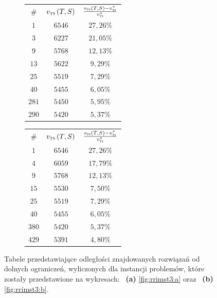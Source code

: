 \begin{figure}[!htbp]
	\null\hfill
	\begin{subfigure}[b]{0.3\textwidth}
		\centering
		\begin{tabular}{ccc}
			\hline
			\# & $v_{\textsc{ts}} \left( T, S \right)$ & $\frac{v_{\textsc{ts}} \left( T, S \right) - v_{\textsc{ts}}^{\ast}}{v_{\textsc{ts}}^{\ast}}$ \\
			$1$	&	$6546$	&	$27,26\%$	\\
			$3$	&	$6227$	&	$21,05\%$	\\
			$9$	&	$5768$	&	$12,13\%$	\\
			$13$	&	$5622$	&	$9,29\%$	\\
			$25$	&	$5519$	&	$7,29\%$	\\
			$40$	&	$5455$	&	$6,05\%$	\\
			$281$	&	$5450$	&	$5,95\%$	\\
			$290$	&	$5420$	&	$5,37\%$ \\\hline                                                                                                    
		\end{tabular}
		\caption{}
		\label{fig:rrimst3tab:a}
	\end{subfigure}
	\hfill
	\begin{subfigure}[b]{0.3\textwidth}
		\centering
		\begin{tabular}{ccc}
			\hline
			\# & $v_{\textsc{ts}} \left( T, S \right)$ & $\frac{v_{\textsc{ts}} \left( T, S \right) - v_{\textsc{ts}}^{\ast}}{v_{\textsc{ts}}^{\ast}}$ \\
			$1$	&	$6546$	&	$27,26\%$	\\
			$4$	&	$6059$	&	$17,79\%$	\\
			$9$	&	$5768$	&	$12,13\%$	\\
			$15$	&	$5530$	&	$7,50\%$	\\
			$25$	&	$5519$	&	$7,29\%$	\\
			$40$	&	$5455$	&	$6,05\%$	\\
			$380$	&	$5420$	&	$5,37\%$	\\
			$429$	&	$5391$	&	$4,80\%$	\\\hline                                                                                                  
		\end{tabular}
		\caption{}
		\label{fig:rrimst3tab:b}
	\end{subfigure}
	\hfill\null
	\caption{
		Tabele przedstawiające odległości znajdowanych rozwiązań od dolnych ograniczeń, wyliczonych dla instancji problemów, które zostały przedstawione na wykresach: ~\textbf{(a)} \ref{fig:rrimst3:a} oraz ~\textbf{(b)} \ref{fig:rrimst3:b}.
	}
	\label{fig:rrimst3tab}
\end{figure}



